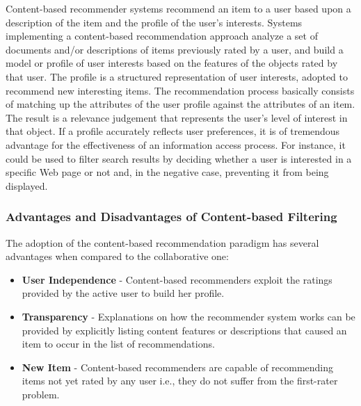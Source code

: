 \begin{enumerate}
 Content-based recommender systems recommend an item to a user based upon a description of the item and the profile of the user's interests. Systems implementing a content-based recommendation approach analyze a set of documents and/or descriptions of items previously rated by a user, and build a model or profile of user interests based on the features of the objects rated by that user. The profile is a structured representation of user interests, adopted to recommend new interesting items. The recommendation process basically consists of matching up the attributes of the user profile against the attributes of an item. The result is a relevance judgement that represents the user’s level of interest in that object. If a profile accurately reflects user preferences, it is of tremendous advantage for the effectiveness of an information access process. For instance, it could be used to filter search results by deciding whether a user is interested in a specific Web page or not and, in the negative case, preventing it from being displayed.
\subsubsection{Advantages and Disadvantages of Content-based Filtering}

 The adoption of the content-based recommendation paradigm has several advantages when compared to the collaborative one:
\begin{itemize}
\item \textbf{User Independence} - Content-based recommenders exploit the ratings provided by the active user to build her profile.
\end{itemize}
\begin{itemize}
\item \textbf{Transparency} - Explanations on how the recommender system works can be provided by explicitly listing content features or descriptions that caused an item to occur in the list of recommendations. 
\end{itemize}
\begin{itemize}
\item \textbf{New Item} - Content-based recommenders are capable of recommending items not yet rated by any user i.e., they do not suffer from the first-rater problem.
\end{itemize}


\end{enumerate}
